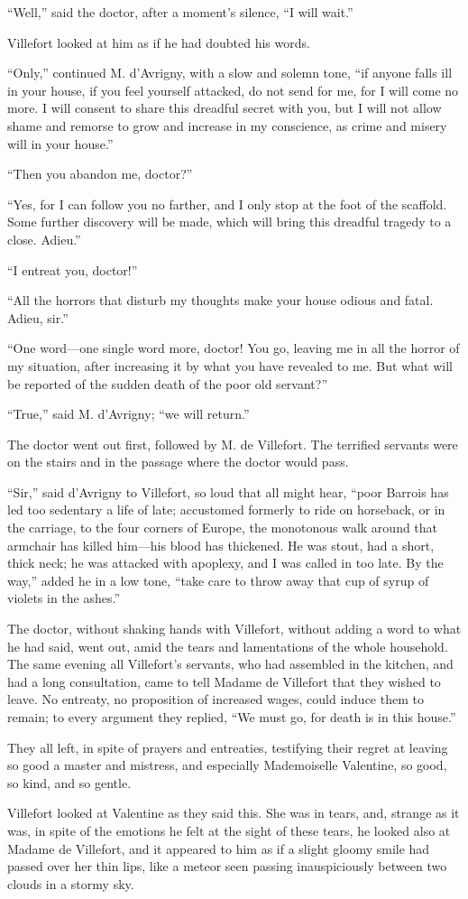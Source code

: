 “Well,” said the doctor, after a moment’s silence, “I will wait.”

Villefort looked at him as if he had doubted his words.

“Only,” continued M. d’Avrigny, with a slow and solemn tone, “if anyone
falls ill in your house, if you feel yourself attacked, do not send for
me, for I will come no more. I will consent to share this dreadful
secret with you, but I will not allow shame and remorse to grow and
increase in my conscience, as crime and misery will in your house.”

“Then you abandon me, doctor?”

“Yes, for I can follow you no farther, and I only stop at the foot of
the scaffold. Some further discovery will be made, which will bring
this dreadful tragedy to a close. Adieu.”

“I entreat you, doctor!”

“All the horrors that disturb my thoughts make your house odious and
fatal. Adieu, sir.”

“One word—one single word more, doctor! You go, leaving me in all the
horror of my situation, after increasing it by what you have revealed
to me. But what will be reported of the sudden death of the poor old
servant?”

“True,” said M. d’Avrigny; “we will return.”

The doctor went out first, followed by M. de Villefort. The terrified
servants were on the stairs and in the passage where the doctor would
pass.

“Sir,” said d’Avrigny to Villefort, so loud that all might hear, “poor
Barrois has led too sedentary a life of late; accustomed formerly to
ride on horseback, or in the carriage, to the four corners of Europe,
the monotonous walk around that armchair has killed him—his blood has
thickened. He was stout, had a short, thick neck; he was attacked with
apoplexy, and I was called in too late. By the way,” added he in a low
tone, “take care to throw away that cup of syrup of violets in the
ashes.”

The doctor, without shaking hands with Villefort, without adding a word
to what he had said, went out, amid the tears and lamentations of the
whole household. The same evening all Villefort’s servants, who had
assembled in the kitchen, and had a long consultation, came to tell
Madame de Villefort that they wished to leave. No entreaty, no
proposition of increased wages, could induce them to remain; to every
argument they replied, “We must go, for death is in this house.”

They all left, in spite of prayers and entreaties, testifying their
regret at leaving so good a master and mistress, and especially
Mademoiselle Valentine, so good, so kind, and so gentle.

Villefort looked at Valentine as they said this. She was in tears, and,
strange as it was, in spite of the emotions he felt at the sight of
these tears, he looked also at Madame de Villefort, and it appeared to
him as if a slight gloomy smile had passed over her thin lips, like a
meteor seen passing inauspiciously between two clouds in a stormy sky.
